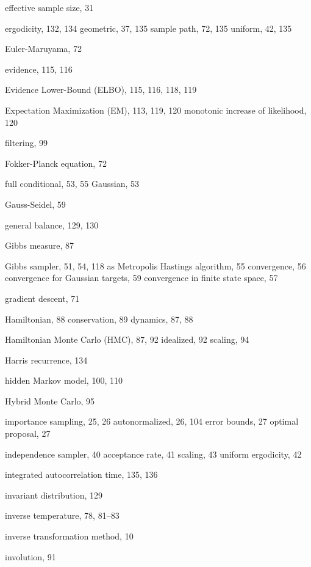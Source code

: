 \begin{theindex}
\indexspace

\item effective sample size, 31
\item ergodicity, 132, 134
  \subitem geometric, 37, 135
  \subitem sample path, 72, 135
  \subitem uniform, 42, 135
\item Euler-Maruyama, 72
\item evidence, 115, 116
\item Evidence Lower-Bound (ELBO), 115, 116, 118, 119
\item Expectation Maximization (EM), 113, 119, 120
  \subitem monotonic increase of likelihood, 120

\indexspace

\item filtering, 99
\item Fokker-Planck equation, 72
\item full conditional, 53, 55
  \subitem Gaussian, 53

\indexspace

\item Gauss-Seidel, 59
\item general balance, 129, 130
\item Gibbs measure, 87
\item Gibbs sampler, 51, 54, 118
  \subitem as Metropolis Hastings algorithm, 55
  \subitem convergence, 56
  \subitem convergence for Gaussian targets, 59
  \subitem convergence in finite state space, 57
\item gradient descent, 71

\indexspace

\item Hamiltonian, 88
  \subitem conservation, 89
  \subitem dynamics, 87, 88
\item Hamiltonian Monte Carlo (HMC), 87, 92
  \subitem idealized, 92
  \subitem scaling, 94
\item Harris recurrence, 134
\item hidden Markov model, 100, 110
\item Hybrid Monte Carlo, 95

\indexspace

\item importance sampling, 25, 26
  \subitem autonormalized, 26, 104
  \subitem error bounds, 27
  \subitem optimal proposal, 27
\item independence sampler, 40
  \subitem acceptance rate, 41
  \subitem scaling, 43
  \subitem uniform ergodicity, 42
\item integrated autocorrelation time, 135, 136
\item invariant distribution, 129
\item inverse temperature, 78, 81--83
\item inverse transformation method, 10
\item involution, 91


\end{theindex}
